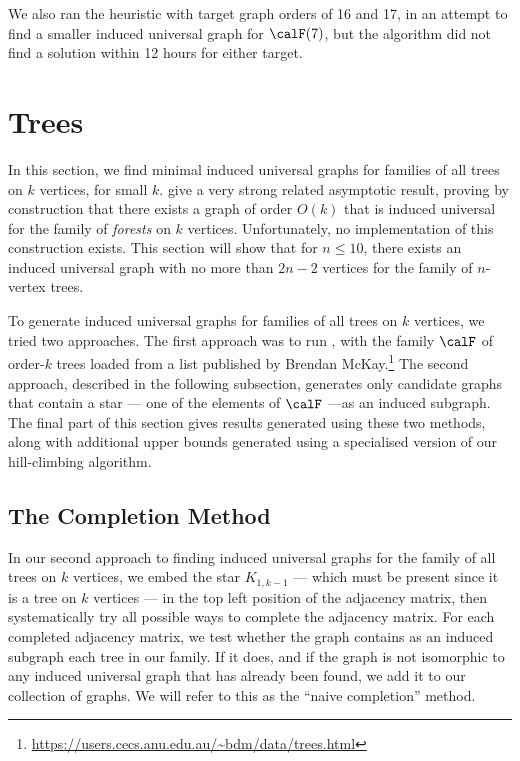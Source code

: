 We also ran the heuristic with target graph orders of 16 and 17, in an
attempt to find a smaller induced universal graph for $\calF(7)$, but the algorithm
did not find a solution within 12 hours for either target.

\section{Trees}\label{sec:trees}

In this section, we find minimal induced universal graphs for families
of all trees on $k$ vertices, for small $k$.
\citet{DBLP:journals/jacm/AlstrupDK17}
give a very strong related asymptotic result, proving by construction that
there exists a graph of order $O(k)$ that is induced universal for the family of
\emph{forests} on $k$ vertices.  Unfortunately, no implementation of this
construction exists.  This section will show that for $n \leq 10$, there
exists an induced universal graph with no more than $2n - 2$ vertices
for the family of $n$-vertex trees.

To generate induced universal graphs for families of
all trees on $k$ vertices, we tried two approaches.
The first approach was to run , with the family
$\calF$ of order-$k$ trees loaded from
a list published by Brendan
McKay.\footnote{\url{https://users.cecs.anu.edu.au/~bdm/data/trees.html}}
The second approach, described in the following subsection, generates
only candidate graphs that contain a star --- one of the elements
of $\calF$ ---as an induced subgraph.  The final part of this section
gives results generated using these two methods, along with additional
upper bounds generated using a specialised version of our hill-climbing
algorithm.

\subsection{The Completion Method}

In our second approach to finding induced universal graphs for the
family of all trees on $k$ vertices, we embed the star $K_{1,k-1}$ --- which must be
present since it is a tree on $k$ vertices --- in the top left position
of the adjacency matrix, then systematically try all possible ways to complete
the adjacency matrix.  For each completed adjacency matrix, we test whether
the graph contains as an induced subgraph each tree in our family.
If it does, and if the graph is not isomorphic to any induced universal
graph that has already been found, we add it to our collection of graphs.
We will refer to this as the ``naive completion'' method.

